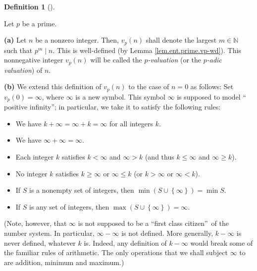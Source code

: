 \documentclass[numbers=enddot,12pt,final,onecolumn,notitlepage]{scrartcl}%
\numberwithin{exer}{subsection}
\theoremstyle{definition}
\newtheorem{defi}[theo]{Definition}
\newenvironment{definition}[1][]
{\begin{defi}[#1]\begin{leftbar}}
{\end{leftbar}\end{defi}}
\begin{document}
\begin{definition}
\label{def.ent.prime.vp}Let $p$ be a prime.

\textbf{(a)} Let $n$ be a nonzero integer. Then, $v_{p}\left(  n\right)  $
shall denote the largest $m\in\mathbb{N}$ such that $p^{m}\mid n$. This is
well-defined (by Lemma \ref{lem.ent.prime.vp-wd}). This nonnegative integer
$v_{p}\left(  n\right)  $ will be called the $p$\textit{-valuation} (or the
$p$\textit{-adic valuation}) of $n$.

\textbf{(b)} We extend this definition of $v_{p}\left(  n\right)  $ to the
case of $n=0$ as follows: Set $v_{p}\left(  0\right)  =\infty$, where $\infty$
is a new symbol. This symbol $\infty$ is supposed to model \textquotedblleft
positive infinity\textquotedblright; in particular, we take it to satisfy the
following rules:

\begin{itemize}
\item We have $k+\infty=\infty+k=\infty$ for all integers $k$.

\item We have $\infty+\infty=\infty$.

\item Each integer $k$ satisfies $k<\infty$ and $\infty>k$ (and thus
$k\leq\infty$ and $\infty\geq k$).

\item No integer $k$ satisfies $k\geq\infty$ or $\infty\leq k$ (or $k>\infty$
or $\infty<k$).

\item If $S$ is a nonempty set of integers, then $\min\left(  S\cup\left\{
\infty\right\}  \right)  =\min S$.

\item If $S$ is any set of integers, then $\max\left(  S\cup\left\{
\infty\right\}  \right)  =\infty$.
\end{itemize}

(Note, however, that $\infty$ is not supposed to be a \textquotedblleft first
class citizen\textquotedblright\ of the number system. In particular,
$\infty-\infty$ is not defined. More generally, $k-\infty$ is never defined,
whatever $k$ is. Indeed, any definition of $k-\infty$ would break some of the
familiar rules of arithmetic. The only operations that we shall subject
$\infty$ to are addition, minimum and maximum.)
\end{definition}
\end{document}
